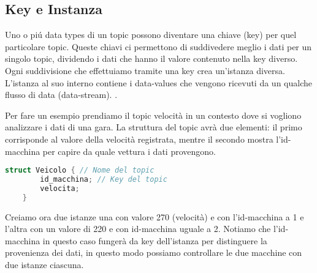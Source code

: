 \subsection{Key e Instanza}
Uno o piú data types di un topic possono diventare una chiave (key) per 
quel particolare topic. Queste chiavi ci permettono di suddivedere meglio
i dati per un singolo topic, dividendo i dati che hanno il valore contenuto
nella key diverso. Ogni suddivisione che effettuiamo tramite una key crea 
un'istanza diversa. L'istanza al suo interno contiene i data-values che 
vengono ricevuti da un qualche flusso di data (data-stream).
 \cite{Instance81:online}.

Per fare un esempio prendiamo il topic velocità in un contesto dove si
vogliono analizzare i dati di una gara.
La struttura del topic avrà due elementi: il primo corrisponde al valore
della velocità registrata, mentre il secondo mostra l'id-macchina per 
capire da quale vettura i dati provengono.

\vspace{5mm} %
\begin{lstlisting}[language=C++, caption=Esempio di Topic con una key
    usando il linguaggio IDL
    , label=Topic struct,
    captionpos=b]
    struct Veicolo { // Nome del topic
        id_macchina; // Key del topic
        velocita;
    }
    \end{lstlisting}
\vspace{5mm}

Creiamo ora due istanze una con valore 270 (velocità) e con 
l'id-macchina a 1 e l'altra con un valore di 220 e con id-macchina 
uguale a 2. Notiamo che l'id-macchina in questo caso fungerà da key 
dell'istanza per distinguere la provenienza dei dati, in questo
modo possiamo controllare le due macchine con due istanze ciascuna.



    


